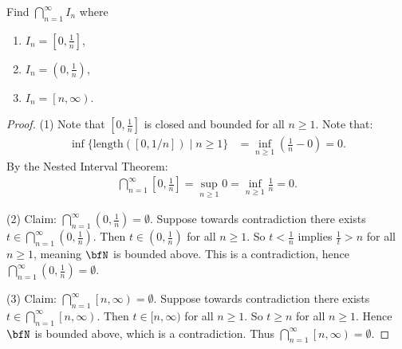 \documentclass[10pt,twoside,openany]{memoir}
\begin{document}
    \begin{exercise}
        Find $\bigcap_{n = 1}^\infty I_n$ where
            \begin{enumerate}[label = (\arabic*)]
                \item $I_n = \left[0,\frac{1}{n}\right]$,
                \item $I_n = \left(0, \frac{1}{n}\right)$,
                \item $I_n = \left[n , \infty\right)$.
            \end{enumerate}
    \end{exercise}
        \begin{proof}
            (1) Note that $[0,\frac{1}{n}]$ is closed and bounded for all $n \geq 1$. Note that:
                \begin{equation*}
                \begin{split}
                    \inf \{\text{length}\left(\left[0,1/n\right]\right) \mid n \geq 1 \} 
                     &= \inf_{n \geq 1} \left(\frac{1}{n} - 0\right) 
                      = 0.
                \end{split}
                \end{equation*}
            By the Nested Interval Theorem:
                \begin{equation*}
                \begin{split}
                    \bigcap_{n=1}^\infty \left[0 , \frac{1}{n}\right] = \sup_{n \geq 1} 0 = \inf_{n \geq 1} \frac{1}{n} = 0.
                \end{split}
                \end{equation*}

            (2) Claim: $\bigcap_{n=1}^\infty \left(0, \frac{1}{n}\right) = \emptyset$. Suppose towards contradiction there exists $t \in \bigcap_{n=1}^\infty \left(0, \frac{1}{n}\right)$. Then $t \in \left(0 ,\frac{1}{n}\right)$ for all $n \geq 1$. So $t < \frac{1}{n}$ implies $\frac{1}{t} > n$ for all $n\geq 1$, meaning $\bfN$ is bounded above. This is a contradiction, hence $\bigcap_{n=1}^\infty \left(0, \frac{1}{n}\right) = \emptyset$.

            (3) Claim: $\bigcap_{n=1}^\infty \left[n, \infty\right) = \emptyset$. Suppose towards contradiction there exists $t \in \bigcap_{n=1}^\infty \left[n, \infty\right)$. Then $t \in [n,\infty)$ for all $n \geq 1$. So $t \geq n$ for all $n \geq 1$. Hence $\bfN$ is bounded above, which is a contradiction. Thus $\bigcap_{n=1}^\infty \left[n, \infty\right) = \emptyset$.
        \end{proof}
\end{document}
